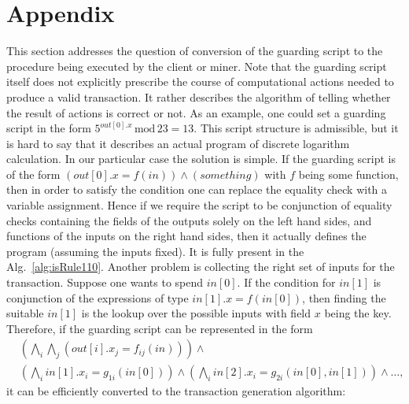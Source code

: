 \documentclass[runningheads]{llncs}
\begin{document}
    \section*{Appendix}
    \label{appendix1}
    This section addresses the question of conversion of the guarding script to
    the procedure being executed by the client or miner. Note that the guarding
    script itself does not explicitly prescribe the course of computational
    actions needed to produce a valid transaction. It rather describes the
    algorithm of telling whether the result of actions is correct or not. As an
    example, one could set a guarding script in the form
    $5^{out[0].x}\,\textrm{mod}\, 23 = 13$. This script structure is admissible,
    but it is hard to say that it describes an actual program of discrete
    logarithm calculation. In our particular case the solution is simple. If the
    guarding script is of the form $(out[0].x=f(in))\wedge(something)$ with $f$
    being some function, then in order to satisfy the condition one can replace
    the equality check with a variable assignment. Hence if we require the script
    to be conjunction of equality checks containing the fields of the outputs
    solely on the left hand sides, and functions of the inputs on the right hand
    sides, then it actually defines the program (assuming the inputs fixed). It
    is fully present in the Alg.~\ref{alg:isRule110}. Another problem is collecting the right set
    of inputs for the transaction. Suppose one wants to spend $in[0]$. If the
    condition for $in[1]$ is conjunction of the expressions of type
    $in[1].x=f(in[0])$, then finding the suitable $in[1]$ is the lookup over the
    possible inputs with field $x$ being the key. Therefore, if the guarding
    script can be represented in the form
    \begin{eqnarray}
        \label{eq:scr}
        \nonumber
        &\left(\bigwedge_i\bigwedge_j(out[i].x_j=f_{ij}(in))\right)\wedge \\ 
        &\left(\bigwedge_i in[1].x_i  = g_{1i}(in[0])\right)\wedge
        \left(\bigwedge_i in[2].x_i =
        g_{2i}(in[0],in[1])\right)\wedge\dots,
        \label{eq:convertable}
    \end{eqnarray}
    it can be efficiently converted to the transaction generation algorithm:
\end{document}
